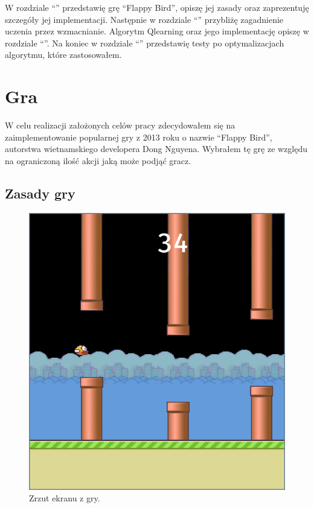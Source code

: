 \documentclass[a4paper, 12pt,oneside]{book}
\begin{document}
W rozdziale ``'' przedstawię grę ``Flappy Bird'',
opiszę jej
zasady oraz zaprezentuję szczegóły jej implementacji. Następnie w rozdziale
``'' przybliżę zagadnienie uczenia przez
wzmacnianie. Algorytm Q\dywiz learning oraz jego implementację opiszę w
rozdziale ``''. Na koniec w rozdziale
``'' przedstawię testy po optymalizacjach algorytmu,
które zastosowałem.
\newpage{}

\chapter{Gra}
\label{chapter:gra}
W celu realizacji założonych celów pracy zdecydowałem się na zaimplementowanie
popularnej gry z 2013 roku o nazwie ``Flappy Bird'',  autorstwa wietnamskiego
developera Dong Nguyena\cite{flappy_bird_author}. Wybrałem tę grę ze względu na
ograniczoną ilość akcji jaką może podjąć gracz.
\section{Zasady gry} 
\begin{figure}[h] 
	\begin{center}
		\includegraphics[scale=0.40]{flappy_bird.png}
		\caption{Zrzut ekranu z gry.}
		\label{flappy_screenshot}
	\end{center}
\end{figure}
\end{document}
